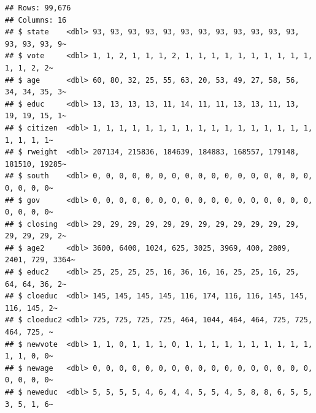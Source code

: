 \documentclass[
]{book}
\begin{document}
\begin{verbatim}
## Rows: 99,676
## Columns: 16
## $ state    <dbl> 93, 93, 93, 93, 93, 93, 93, 93, 93, 93, 93, 93, 93, 93, 93, 9~
## $ vote     <dbl> 1, 1, 2, 1, 1, 1, 2, 1, 1, 1, 1, 1, 1, 1, 1, 1, 1, 1, 1, 2, 2~
## $ age      <dbl> 60, 80, 32, 25, 55, 63, 20, 53, 49, 27, 58, 56, 34, 34, 35, 3~
## $ educ     <dbl> 13, 13, 13, 13, 11, 14, 11, 11, 13, 13, 11, 13, 19, 19, 15, 1~
## $ citizen  <dbl> 1, 1, 1, 1, 1, 1, 1, 1, 1, 1, 1, 1, 1, 1, 1, 1, 1, 1, 1, 1, 1~
## $ rweight  <dbl> 207134, 215836, 184639, 184883, 168557, 179148, 181510, 19285~
## $ south    <dbl> 0, 0, 0, 0, 0, 0, 0, 0, 0, 0, 0, 0, 0, 0, 0, 0, 0, 0, 0, 0, 0~
## $ gov      <dbl> 0, 0, 0, 0, 0, 0, 0, 0, 0, 0, 0, 0, 0, 0, 0, 0, 0, 0, 0, 0, 0~
## $ closing  <dbl> 29, 29, 29, 29, 29, 29, 29, 29, 29, 29, 29, 29, 29, 29, 29, 2~
## $ age2     <dbl> 3600, 6400, 1024, 625, 3025, 3969, 400, 2809, 2401, 729, 3364~
## $ educ2    <dbl> 25, 25, 25, 25, 16, 36, 16, 16, 25, 25, 16, 25, 64, 64, 36, 2~
## $ cloeduc  <dbl> 145, 145, 145, 145, 116, 174, 116, 116, 145, 145, 116, 145, 2~
## $ cloeduc2 <dbl> 725, 725, 725, 725, 464, 1044, 464, 464, 725, 725, 464, 725, ~
## $ newvote  <dbl> 1, 1, 0, 1, 1, 1, 0, 1, 1, 1, 1, 1, 1, 1, 1, 1, 1, 1, 1, 0, 0~
## $ newage   <dbl> 0, 0, 0, 0, 0, 0, 0, 0, 0, 0, 0, 0, 0, 0, 0, 0, 0, 0, 0, 0, 0~
## $ neweduc  <dbl> 5, 5, 5, 5, 4, 6, 4, 4, 5, 5, 4, 5, 8, 8, 6, 5, 5, 3, 5, 1, 6~
\end{verbatim}
\end{document}
